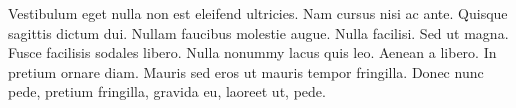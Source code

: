 \documentclass[eng,printmode]{mgr}
\begin{document}
Vestibulum eget nulla non est eleifend ultricies. Nam cursus nisi ac ante. Quisque sagittis dictum dui. Nullam faucibus molestie augue. Nulla facilisi. Sed ut magna. Fusce facilisis sodales libero. Nulla nonummy lacus quis leo. Aenean a libero. In pretium ornare diam. Mauris sed eros ut mauris tempor fringilla. Donec nunc pede, pretium fringilla, gravida eu, laoreet ut, pede.

\end{document}
